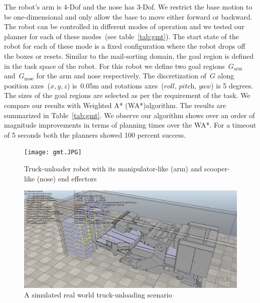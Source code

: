 \documentclass[a4paper]{report}
\begin{document}
The robot's arm is 4-Dof and the nose has 3-Dof. We restrict the base motion to be one-dimensional and only allow the base to move either forward or backward. The robot can be controlled in different modes of operation and we tested our planner for each of these modes~(see table~\ref{tab:gmt}). The start state of the robot for each of these mode is a fixed configuration where the robot drops off the boxes or resets. Similar to the mail-sorting domain, the goal region is defined in the task space of the robot. For this robot we define two goal regions~$G_{\textrm{arm}}$ and~$G_{\textrm{nose}}$ for the arm and nose respectively. The discretization of~$G$ along position axes~($x,y,z$) is~0.05m and rotations axes~($\textit{roll, pitch, yaw}$) is 5 degrees. The sizes of the goal regions are selected as per the requirement of the task.
We compare our results with Weighted A* (WA*)algorithm. The results are summarized in Table~\ref{tab:gmt}. We observe our algorithm shows over an order of magnitude improvements in terms of planning times over the WA*. For a timeout of 5 seconds both the planners showed 100 percent success.

\begin{figure}
\centering
\texttt{[image: gmt.JPG]}
  \caption{
  Truck-unloader robot with its manipulator-like (arm) and scooper-like (nose) end effectors
}
    \label{fig:gmt}
\end{figure}

\begin{figure}
\centering
\includegraphics[width=\textwidth]{gmt_sim.png}
  \caption{
  A simulated real world truck-unloading scenario
}
    \label{fig:gmt_sim}
\end{figure}
\end{document}

